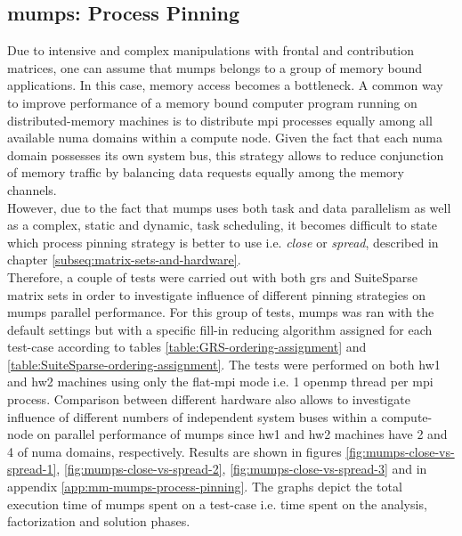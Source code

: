 \subsection{\gls{mumps}: Process Pinning}
\label{subseq:mm-mumps-process-pinning}

Due to intensive and complex manipulations with frontal and contribution matrices, one can assume that \acrshort{mumps} belongs to a group of memory bound applications. In this case, memory access becomes a bottleneck. A common way to improve performance of a memory bound computer program running on distributed-memory machines is to distribute \acrshort{mpi} processes equally among all available \acrshort{numa} domains within a compute node. Given the fact that each \acrshort{numa} domain possesses its own system bus, this strategy allows to reduce conjunction of memory traffic by balancing data requests equally among the memory channels.\\


However, due to the fact that \acrshort{mumps} uses both task and data parallelism as well as a complex, static and dynamic, task scheduling, it becomes difficult to state which process pinning strategy is better to use i.e. \textit{close} or \textit{spread}, described in chapter \ref{subseq:matrix-sets-and-hardware}.\\


Therefore, a couple of tests were carried out with both \acrshort{grs} and SuiteSparse matrix sets in order to investigate influence of different pinning strategies on \acrshort{mumps} parallel performance. For this group of tests, \acrshort{mumps} was ran with the default settings but with a specific fill-in reducing algorithm assigned for each test-case according to tables \ref{table:GRS-ordering-assignment} and \ref{table:SuiteSparse-ordering-assignment}. The tests were performed on both \gls{hw1} and \gls{hw2} machines using only the flat-\acrshort{mpi} mode i.e. 1 \acrshort{openmp} thread per \acrshort{mpi} process. Comparison between different hardware also allows to investigate influence of different numbers of independent system buses within a compute-node on parallel performance of \acrshort{mumps} since \gls{hw1} and \gls{hw2} machines have 2 and 4 of \acrshort{numa} domains, respectively. Results are shown in figures \ref{fig:mumps-close-vs-spread-1}, \ref{fig:mumps-close-vs-spread-2}, \ref{fig:mumps-close-vs-spread-3} and in appendix \ref{app:mm-mumps-process-pinning}. The graphs depict the total execution time of \acrshort{mumps} spent on a test-case i.e. time spent on the analysis, factorization and solution phases.\\

